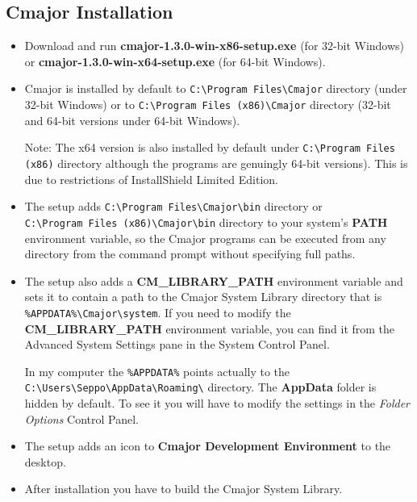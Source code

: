 \documentclass[oneside, a4paper, 11pt]{article}
\begin{document}
\subsection{Cmajor Installation}

\begin{itemize}

\item
Download and run \textbf{cmajor-1.3.0-win-x86-setup.exe} (for 32-bit Windows) or
\textbf{cmajor-1.3.0-win-x64-setup.exe} (for 64-bit Windows).

\item
Cmajor is installed by default to \verb|C:\Program Files\Cmajor| directory (under 32-bit Windows) or
to \verb|C:\Program Files (x86)\Cmajor| directory (32-bit and 64-bit versions under 64-bit Windows).

Note: The x64 version is also installed by default under
\verb|C:\Program Files (x86)| directory although the programs are genuingly 64-bit versions).
This is due to restrictions of InstallShield Limited Edition.

\item
The setup adds \verb|C:\Program Files\Cmajor\bin| directory or \\
\verb|C:\Program Files (x86)\Cmajor\bin| directory
to your system's \textbf{PATH} environment variable, so the Cmajor programs can be executed from any
directory from the command prompt without specifying full paths.

\item
The setup also adds a \textbf{CM\_LIBRARY\_PATH} environment variable and
sets it to contain a path to the Cmajor System Library directory
that is \verb|%APPDATA%\Cmajor\system|. If you need to modify the
\textbf{CM\_LIBRARY\_PATH} environment variable, you can find it from the Advanced System Settings pane in the System Control Panel.

In my computer the \verb|%APPDATA%| points actually to the
\verb|C:\Users\Seppo\AppData\Roaming\| directory. The \textbf{AppData} folder
is hidden by default. To see it you will have to modify the settings in
the \emph{Folder Options} Control Panel.

\item
The setup adds an icon to \textbf{Cmajor Development Environment} to the desktop.

\item
After installation you have to build the Cmajor System Library.

\end{itemize}
\end{document}
